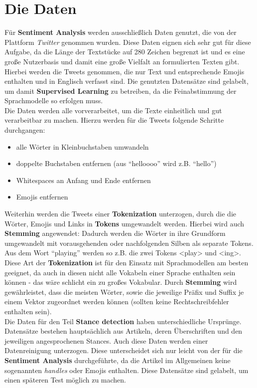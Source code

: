 \section{Die Daten}
F\"ur \textbf{Sentiment Analysis} werden ausschlie{\ss}lich Daten genutzt, die von der Plattform \textit{Twitter} genommen wurden. Diese Daten eignen sich sehr gut f\"ur diese Aufgabe, da die L\"ange der Textst\"ucke auf 280 Zeichen begrenzt ist \cite{twitter} und es eine gro{\ss}e Nutzerbasis und damit eine gro{\ss}e Vielfalt an formulierten Texten gibt. Hierbei werden die Tweets genommen, die nur Text und entsprechende Emojis enthalten und in Englisch verfasst sind. Die genutzten Datens\"atze sind gelabelt, um damit \textbf{Supervised Learning} zu betreiben, da die Feinabstimmung der Sprachmodelle so erfolgen muss.\\
Die Daten werden alle vorverarbeitet, um die Texte einheitlich und gut verarbeitbar zu machen. Hierzu werden f\"ur die Tweets folgende Schritte durchgangen:
\begin{itemize}
\item alle W\"orter in Kleinbuchstaben umwandeln
\item doppelte Buchstaben entfernen (aus "`helloooo"' wird z.B. "`hello"') 
\item Whitespaces an Anfang und Ende entfernen
\item Emojis entfernen
\end{itemize}
Weiterhin werden die Tweets einer \textbf{Tokenization} unterzogen, durch die die W\"orter, Emojis und Links in \textbf{Tokens} umgewandelt werden. Hierbei wird auch \textbf{Stemming} angewendet: Dadurch werden die W\"orter in ihre Grundform umgewandelt mit vorausgehenden oder nachfolgenden Silben als separate Tokens. Aus dem Wort "`playing"' werden so z.B. die zwei Tokens <play> und <ing>. Diese Art der \textbf{Tokenization} ist f\"ur den Einsatz mit Sprachmodellen am besten geeignet, da auch in diesen nicht alle Vokabeln einer Sprache enthalten sein k\"onnen - das w\"are schlicht ein zu gro{\ss}es Vokabular. Durch \textbf{Stemming} wird gew\"ahrleistet, dass die meisten W\"orter, sowie die jeweilige Pr\"afix und Suffix je einem Vektor zugeordnet werden k\"onnen (sollten keine Rechtschreibfehler enthalten sein).\\
Die Daten f\"ur den Teil \textbf{Stance detection} haben unterschiedliche Urspr\"unge. Datens\"atze bestehen haupts\"achlich aus Artikeln, deren \"Uberschriften und den jeweiligen angesprochenen Stances. Auch diese Daten werden einer Datenreinigung unterzogen. Diese unterscheidet sich nur leicht von der f\"ur die \textbf{Sentiment Analysis} durchgef\"uhrte, da die Artikel im Allgemeinen keine sogenannten \textit{handles} oder Emojis enthalten. Diese Datens\"atze sind gelabelt, um einen sp\"ateren Test m\"oglich zu machen.\\
